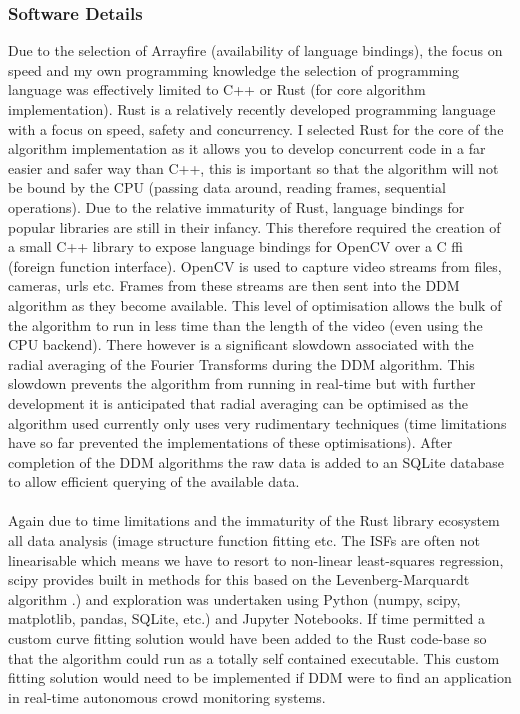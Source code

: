 \documentclass[10pt]{article}
\begin{document}
\subsubsection{Software Details}
Due to the selection of Arrayfire (availability of language bindings), the focus on speed and my own programming knowledge the selection of programming language was effectively limited to C++ or Rust \cite{rust} (for core algorithm implementation). Rust is a relatively recently developed programming language with a focus on speed, safety and concurrency. I selected Rust for the core of the algorithm implementation as it allows you to develop concurrent code in a far easier and safer way than C++, this is important so that the algorithm will not be bound by the CPU (passing data around, reading frames, sequential operations). Due to the relative immaturity of Rust, language bindings for popular libraries are still in their infancy. This therefore required the creation of a small C++ library to expose language bindings for OpenCV over a C ffi (foreign function interface). OpenCV is used to capture video streams from files, cameras, urls etc. Frames from these streams are then sent into the DDM algorithm as they become available. This level of optimisation allows the bulk of the algorithm to run in less time than the length of the video (even using the CPU backend). There however is a significant slowdown associated with the radial averaging of the Fourier Transforms during the DDM algorithm. This slowdown prevents the algorithm from running in real-time but with further development it is anticipated that radial averaging can be optimised as the algorithm used currently only uses very rudimentary techniques (time limitations have so far prevented the implementations of these optimisations). After completion of the DDM algorithms the raw data is added to an SQLite database to allow efficient querying of the available data.
\\\\
Again due to time limitations and the immaturity of the Rust library ecosystem all data analysis (image structure function fitting etc. The ISFs are often not linearisable which means we have to resort to non-linear least-squares regression, scipy provides built in methods for this based on the Levenberg-Marquardt algorithm \cite{scipy_fit}.) and exploration was undertaken using Python (numpy, scipy, matplotlib, pandas, SQLite, etc.) and Jupyter Notebooks. If time permitted a custom curve fitting solution would have been added to the Rust code-base so that the algorithm could run as a totally self contained executable. This custom fitting solution would need to be implemented if DDM were to find an application in real-time autonomous crowd monitoring systems.
\end{document}
